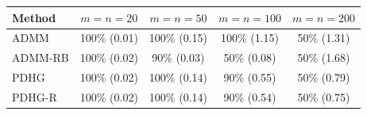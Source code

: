 \begin{tabular}{lcccc}
\toprule
Method & $m=n=20$ & $m=n=50$ & $m=n=100$ & $m=n=200$ \\
\midrule
ADMM & 100\% (0.01) & 100\% (0.15) & 100\% (1.15) & 50\% (1.31) \\
ADMM-RB & 100\% (0.02) & 90\% (0.03) & 50\% (0.08) & 50\% (1.68) \\
PDHG & 100\% (0.02) & 100\% (0.14) & 90\% (0.55) & 50\% (0.79) \\
PDHG-R & 100\% (0.02) & 100\% (0.14) & 90\% (0.54) & 50\% (0.75) \\
\bottomrule
\end{tabular}